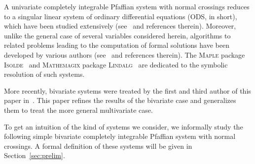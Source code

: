 \documentclass[final,1p,times,number,amsthm]{elsart}
\begin{document}
A univariate completely integrable Pfaffian system with normal crossings reduces
to a singular linear system of ordinary differential equations (ODS, in short),
which have been studied extensively (see~\cite{key6,key7} and references
therein). Moreover, unlike the general case of several variables considered
herein, algorithms to related problems leading to the computation of formal
solutions have been developed by various authors
(see~\cite{key24,key40,key25,key26} and references therein). The \textsc{Maple}
package \textsc{Isolde}~\cite{key27} and \textsc{Mathemagix} package
\textsc{Lindalg}~\cite{key427} are dedicated to the symbolic resolution of such
systems.

More recently, bivariate systems were treated by the first and third author of
this paper in~\cite{key101}. This paper refines the results of the bivariate
case and generalizes them to treat the more general multivariate case.

To get an intuition of the kind of systems we consider, we informally study the
following simple bivariate completely integrable Pfaffian system with normal
crossings. A formal definition of these systems will be given in
Section~\ref{sec:prelim}.
\end{document}
